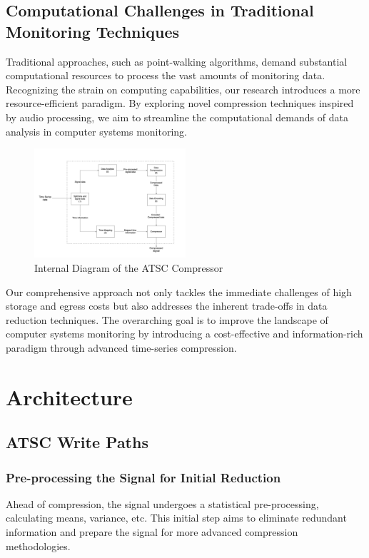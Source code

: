 \documentclass[conference]{IEEEtran}
\begin{document}
\subsection{Computational Challenges in Traditional Monitoring Techniques}
Traditional approaches, such as point-walking algorithms, demand substantial computational resources to process the vast amounts of monitoring data. Recognizing the strain on computing capabilities, our research introduces a more resource-efficient paradigm. By exploring novel compression techniques inspired by audio processing, we aim to streamline the computational demands of data analysis in computer systems monitoring. 

  
\begin{figure}[h]
  \centering
  \includegraphics[width=0.5\textwidth]{Fig2.png}
  \caption{Internal Diagram of the ATSC Compressor}
  \label{internal}
\end{figure}

Our comprehensive approach not only tackles the immediate challenges of high storage and egress costs but also addresses the inherent trade-offs in data reduction techniques. The overarching goal is to improve the landscape of computer systems monitoring by introducing a cost-effective and information-rich paradigm through advanced time-series compression. 



\section{Architecture}

\subsection{ATSC Write Paths}

\subsubsection{Pre-processing the Signal for Initial Reduction}
Ahead of compression, the signal undergoes a statistical pre-processing, calculating means, variance, etc. This initial step aims to eliminate redundant information and prepare the signal for more advanced compression methodologies.
\end{document}
